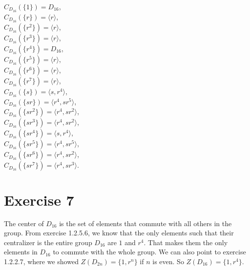\documentclass{article}
\begin{document}
\begin{enumerate}[label=\textbf{\alph*.}]
            $C_{D_{16}}(\{1\}) = D_{16}$, \\
            $C_{D_{16}}(\{r\}) = \langle r \rangle$, \\
            $C_{D_{16}}(\{r^2\}) = \langle r \rangle$, \\
            $C_{D_{16}}(\{r^3\}) = \langle r \rangle$, \\
            $C_{D_{16}}(\{r^4\}) = D_{16}$, \\
            $C_{D_{16}}(\{r^5\}) = \langle r \rangle$, \\
            $C_{D_{16}}(\{r^6\}) = \langle r \rangle$, \\
            $C_{D_{16}}(\{r^7\}) = \langle r \rangle$, \\
            $C_{D_{16}}(\{s\}) = \langle s, r^4 \rangle$, \\
            $C_{D_{16}}(\{sr\}) = \langle r^4, sr^5 \rangle$, \\
            $C_{D_{16}}(\{sr^2\}) = \langle r^4, sr^2 \rangle$, \\
            $C_{D_{16}}(\{sr^3\}) = \langle r^4, sr^2 \rangle$, \\
            $C_{D_{16}}(\{sr^4\}) = \langle s, r^4 \rangle$, \\
            $C_{D_{16}}(\{sr^5\}) = \langle r^4, sr^5 \rangle$, \\
            $C_{D_{16}}(\{sr^6\}) = \langle r^4, sr^2 \rangle$, \\
            $C_{D_{16}}(\{sr^7\}) = \langle r^4, sr^3 \rangle$.  
    \end{enumerate}


    \section*{Exercise 7}
    The center of $D_{16}$ is the set of elements 
    that commute with all others in the group.
    From exercise 1.2.5.6, we know that the only elements
    such that their centralizer is the entire group $D_{16}$
    are $1$ and $r^4$.
    That makes them the only elements in $D_{16}$ to commute
    with the whole group.
    We can also point to exercise 1.2.2.7,
    where we showed $Z(D_{2n}) = \{1, r^n\}$ if $n$ is even.
    So $Z(D_{16}) = \{1, r^4\}$.
\end{document}
